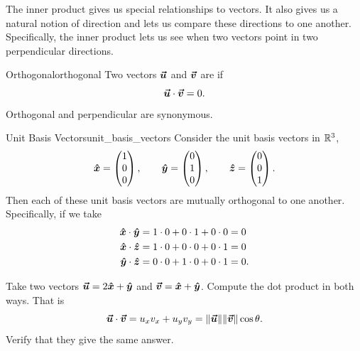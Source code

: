         The inner product gives us special relationships to vectors. It also gives us a natural notion of direction and lets us compare these directions to one another.  Specifically, the inner product lets us see when two vectors point in two perpendicular directions. 
        
        \begin{df}{Orthogonal}{orthogonal}
        Two vectors $\boldsymbol{\boldsymbol{\vec{u}}}$ and $\boldsymbol{\boldsymbol{\vec{v}}}$ are   if
        \[
        \boldsymbol{\boldsymbol{\vec{u}}}\cdot \boldsymbol{\boldsymbol{\vec{v}}}=0.
        \]
        Orthogonal and perpendicular are synonymous.
        \end{df}
        
        \begin{ex}{Unit Basis Vectors}{unit_basis_vectors}
            Consider the unit basis vectors in $\mathbb{R}^3$,
            \[
            \boldsymbol{\hat{x}} = \begin{pmatrix} 1 \\ 0 \\ 0 \end{pmatrix}, \qquad \boldsymbol{\hat{y}} = \begin{pmatrix} 0 \\ 1 \\ 0 \end{pmatrix}, \qquad \boldsymbol{\hat{z}} = \begin{pmatrix} 0 \\ 0 \\ 1 \end{pmatrix}.
            \]
            Then each of these unit basis vectors are mutually orthogonal to one another.  Specifically, if we take
            \begin{align*}
            \boldsymbol{\hat{x}} \cdot \boldsymbol{\hat{y}} &= 1\cdot 0 + 0 \cdot 1 + 0 \cdot 0 = 0\\
            \boldsymbol{\hat{x}} \cdot \boldsymbol{\hat{z}} &= 1\cdot 0 + 0 \cdot 0 + 0 \cdot 1 = 0\\
            \boldsymbol{\hat{y}} \cdot \boldsymbol{\hat{z}} &= 0 \cdot 0 + 1\cdot 0 + 0 \cdot 1 = 0.
            \end{align*}
        \end{ex}
        
        \begin{exercise}
        Take two vectors $\boldsymbol{\boldsymbol{\vec{u}}}=2\boldsymbol{\hat{x}} + \boldsymbol{\hat{y}}$ and $\boldsymbol{\boldsymbol{\vec{v}}}=\boldsymbol{\hat{x}} + \boldsymbol{\hat{y}}$.  Compute the dot product in both ways.  That is
        \[
        \boldsymbol{\boldsymbol{\vec{u}}}\cdot \boldsymbol{\boldsymbol{\vec{v}}}=u_xv_x + u_y v_y=\|\boldsymbol{\boldsymbol{\vec{u}}}\|\|\boldsymbol{\boldsymbol{\vec{v}}}\|\cos \theta.
        \]
        Verify that they give the same answer.
        \end{exercise}
        
